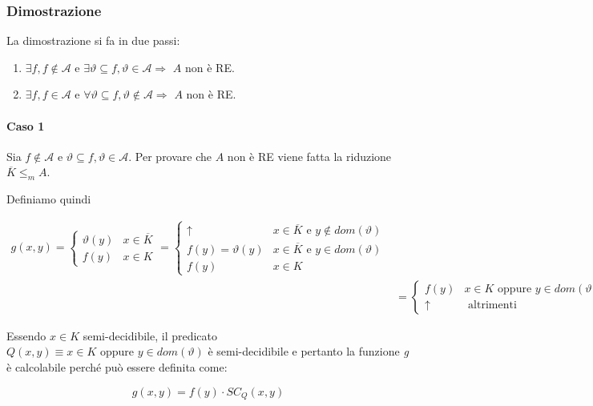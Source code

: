\subsubsection{Dimostrazione}

La dimostrazione si fa in due passi:

\begin{enumerate}
	\item $\exists f, f \notin \mathcal{A}$ e $\exists \vartheta \subseteq f, \vartheta \in \mathcal{A} \Rightarrow$ $A$ non è RE.
	\item $\exists f, f \in \mathcal{A}$ e $\forall \vartheta \subseteq f, \vartheta \notin \mathcal{A} \Rightarrow$ $A$ non è RE.
\end{enumerate}

\paragraph{Caso 1}

Sia $f \notin \mathcal{A}$ e $\vartheta \subseteq f, \vartheta \in \mathcal{A}$. Per provare che $A$ non è RE viene fatta la riduzione $\overline{K} \leq_m A$.

Definiamo quindi 

\begin{align*}
	g(x,y) = \begin{cases}
		\vartheta(y) & x \in \overline{K} \\
		f(y) & x \in K
	\end{cases} = \begin{cases}
	\uparrow & x \in \overline{K} \text{ e } y \notin dom(\vartheta) \\
	f(y) = \vartheta(y)  & x \in \overline{K} \text{ e } y \in dom(\vartheta) \\
	f(y) & x \in K  
	\end{cases} \\
	&= \begin{cases}
	f(y) &x \in K \text{ oppure } y \in dom(\vartheta)\\
	\uparrow & \text{ altrimenti}
	\end{cases} 
\end{align*}

Essendo $x \in K$ semi-decidibile, il predicato $Q(x,y) \equiv x \in K \text{ oppure } y \in dom(\vartheta)$ è semi-decidibile e pertanto la funzione \textit{g} è calcolabile perché può essere definita come:

$$
g(x,y) = f(y) \cdot SC_Q(x,y)
$$

